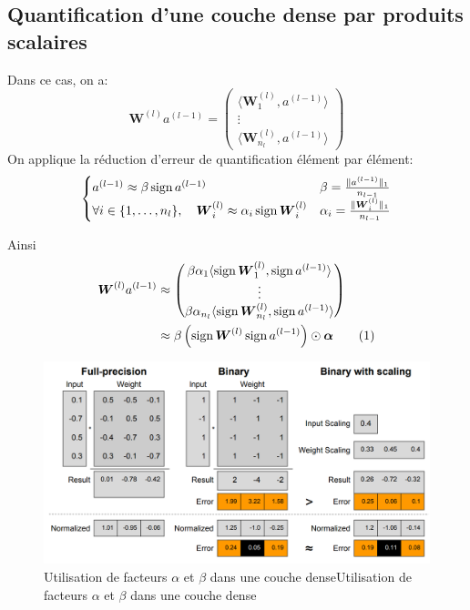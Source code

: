 \subsection{Quantification d'une couche dense par produits scalaires}
Dans ce cas, on a:
\begin{equation*}
	\boldsymbol{W}^{(l)}a^{(l-1)} = \begin{pmatrix}
		\langle \boldsymbol{W}_1^{(l)}, a^{(l-1)} \rangle  \\
		\vdots  \\
		\langle \boldsymbol{W}_{n_l}^{(l)}, a^{(l-1)} \rangle 
	\end{pmatrix}
\end{equation*}
On applique la réduction d'erreur de quantification élément par élément:
\begin{equation}
	\begin{cases}
		a^{(l-1)} \approx \beta \operatorname{sign} a^{(l-1)} & \beta = \frac{\lVert a^{(l-1)}\rVert_1}{n_{l-1}} \\ 
		\forall i\in\{1,\dots,n_l\},\quad \boldsymbol{W}_i^{(l)} \approx \alpha_i \operatorname{sign} \boldsymbol{W}_i^{(l)} & \alpha_i = \frac{\lVert \boldsymbol{W}_i^{(l)} \rVert_1 }{n_{l-1}}
	\end{cases}
\end{equation}

Ainsi 
\begin{align*}
	\boldsymbol{W}^{(l)}a^{(l-1)} &\approx  \begin{pmatrix}
		\beta \alpha_1 \langle \sign \boldsymbol{W}_1^{(l)}, \sign a^{(l-1)} \rangle  \\
		\vdots  \\
		\beta \alpha_{n_l} \langle \sign \boldsymbol{W}_{n_l}^{(l)}, \sign a^{(l-1)} \rangle 
	\end{pmatrix} \\ 
	&\approx \beta  \left(\sign \boldsymbol{W}^{(l)} \sign a^{(l-1)}\right) \odot \boldsymbol{\alpha}  \addtocounter{equation}{1}\tag{\theequation} \label{XnorNet:FullyConnected}
\end{align*}

\begin{figure}[h!]
	\centering
	\includegraphics[width=1\textwidth]{Figures/XNOR-Scaling.png}
	\caption{Utilisation de facteurs $\alpha$ et $\beta$ dans une couche denseUtilisation de facteurs $\alpha$ et $\beta$ dans une couche dense}
	\label{fig:XNOR-Dense}
\end{figure}
\FloatBarrier

